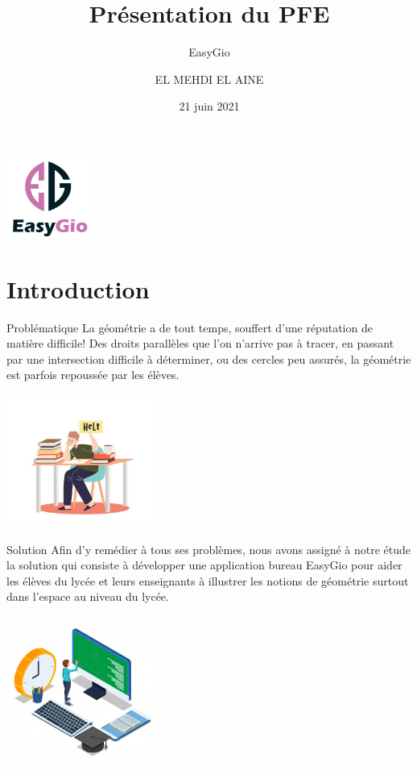 \documentclass{beamer}
\author{EL MEHDI EL AINE}
\title{Présentation du PFE}
\subtitle{EasyGio}
\institute [École supérieure de technologie Safi, GI] {École supérieure de technologie Safi\\Université Cadi Ayyad}
\date{21 juin 2021}
\begin{document}
\begin{frame}
    \titlepage
    \centering
    \includegraphics[width=0.2\textwidth]{pic/logox2.png}
\end{frame}
\begin{frame}
    \tableofcontents[sectionstyle=show,subsectionstyle=show/shaded/hide,subsubsectionstyle=show/shaded/hide]
\end{frame}
\section{Introduction}
\begin{frame}{Problématique}
La géométrie a de tout temps, souffert d'une réputation de matière difficile! Des droits parallèles que l'on n'arrive pas à tracer, en passant par une intersection difficile à déterminer, ou des cercles peu assurés, la géométrie est parfois repoussée par les élèves.
\begin{center}
    \includegraphics[width=5cm]{pic/prob.jpg}
\end{center}
\end{frame}
\begin{frame}{Solution}
Afin d'y remédier à tous ses problèmes, nous avons assigné à notre étude la solution qui consiste à développer une application bureau EasyGio pour aider les élèves du lycée et leurs enseignants à illustrer les notions de géométrie surtout dans l’espace au niveau du lycée.
\begin{center}
    \includegraphics[width=5cm]{pic/solu.jpg}
\end{center}
\end{frame}
\end{document}
